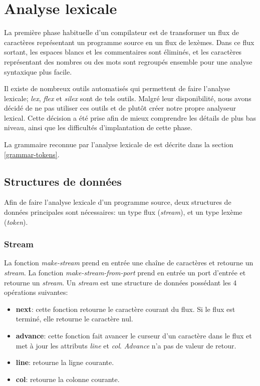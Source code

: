 \documentclass[11pt]{report}
\begin{document}
\chapter{Analyse lexicale}

La première phase habituelle d'un compilateur est de transformer un
flux de caractères représentant un programme source en un flux de
lexèmes.  Dans ce flux sortant, les espaces blancs et les commentaires
sont éliminés, et les caractères représentant des nombres ou des mots
sont regroupés ensemble pour une analyse syntaxique plus facile.

Il existe de nombreux outils automatisés qui permettent de faire
l'analyse lexicale; \emph{lex}, \emph{flex} et \emph{silex} sont de
tels outils.  Malgré leur disponibilité, nous avons décidé de ne pas
utiliser ces outils et de plutôt créer notre propre analyseur lexical.
Cette décision a été prise afin de mieux comprendre les détails de
plus bas niveau, ainsi que les difficultés d'implantation de cette
phase.

La grammaire reconnue par l'analyse lexicale de \sins{} est décrite
dans la section \ref{grammar-tokens}.

\section{Structures de données}

Afin de faire l'analyse lexicale d'un programme source, deux
structures de données principales sont nécessaires: un type flux
(\emph{stream}), et un type lexème (\emph{token}).

\subsection{Stream}

La fonction \emph{make-stream} prend en entrée une chaîne de
caractères et retourne un \emph{stream}.  La fonction
\emph{make-stream-from-port} prend en entrée un port d'entrée et
retourne un \emph{stream}.  Un \emph{stream} est une structure de
données possédant les 4 opérations suivantes:

\begin{itemize}
\item {\bf next}: cette fonction retourne le caractère courant du
  flux.  Si le flux est terminé, elle retourne le caractère nul.
\item {\bf advance}: cette fonction fait avancer le curseur d'un
  caractère dans le flux et met à jour les attributs \emph{line} et
  \emph{col}.  \emph{Advance} n'a pas de valeur de retour.
\item {\bf line}: retourne la ligne courante.
\item {\bf col}: retourne la colonne courante.
\end{itemize}
\end{document}
